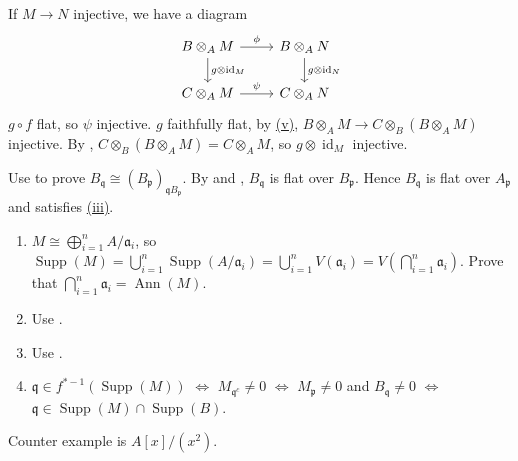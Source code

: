 \begin{exercise}\label{ex3.17}
	If $M\rightarrow N$ injective, we have a diagram
	\begin{equation*}
		\begin{tikzcd}
			B\otimes_AM\arrow[r,"\phi"]\arrow[d,"g\otimes\operatorname{id}_M"]&B\otimes_AN\arrow[d,"g\otimes\operatorname{id}_N"]\\
			C\otimes_AM\arrow[r,"\psi"]&C\otimes_AN
		\end{tikzcd}
	\end{equation*}
	$g\circ f$ flat, so $\psi$ injective. $g$ faithfully flat, by \hyperref[ex3.16]{(v)}, $B\otimes_AM\rightarrow C\otimes_B\left(B\otimes_AM\right)$ injective. By , $C\otimes_B\left(B\otimes_AM\right)=C\otimes_AM$, so $g\otimes\operatorname{id}_M$ injective.
\end{exercise}

\begin{exercise}\label{ex3.18}
	Use  to prove $B_\mathfrak{q}\cong\left(B_\mathfrak{p}\right)_{\mathfrak{q}B_\mathfrak{p}}$. By  and , $B_\mathfrak{q}$ is flat over $B_\mathfrak{p}$. Hence $B_\mathfrak{q}$ is flat over $A_\mathfrak{p}$ and satisfies \hyperref[ex3.16]{(iii)}.
\end{exercise}

\begin{exercise}\label{ex3.19}
	\begin{enumerate}[label=\textup{(\roman*)},ref=\theexercise(\roman*)]
		\addtocounter{enumi}{4}
		\item\label{ex3.19.5} $M\cong\bigoplus_{i=1}^nA/\mathfrak{a}_i$, so $\operatorname{Supp}(M)=\bigcup_{i=1}^n\operatorname{Supp}\left(A/\mathfrak{a}_i\right)=\bigcup_{i=1}^nV(\mathfrak{a}_i)=V\left(\bigcap_{i=1}^n\mathfrak{a}_i\right)$. Prove that $\bigcap_{i=1}^n\mathfrak{a}_i=\operatorname{Ann}(M)$.
		\item Use .
		\item Use .
		\item $\mathfrak{q}\in f^{*-1}\left(\operatorname{Supp}(M)\right)$ $\Leftrightarrow$ $M_{\mathfrak{q}^c}\neq0$ $\Leftrightarrow$ $M_{\mathfrak{p}}\neq0$ and $B_\mathfrak{q}\neq0$ $\Leftrightarrow$ $\mathfrak{q}\in\operatorname{Supp}(M)\cap\operatorname{Supp}(B)$.
	\end{enumerate}
\end{exercise}

\begin{exercise}\label{ex3.20}
	Counter example is $A[x]/\left(x^2\right)$.
\end{exercise}

